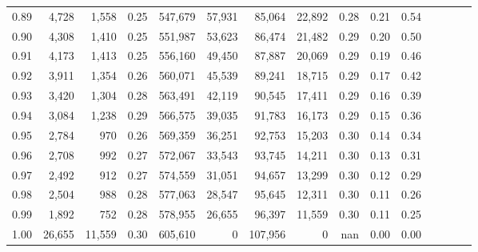 \begin{tabular}{rrrcrrrrrrrrrrr}
0.89 &   4,728 &   1,558 &                                       0.25 &  547,679 &   57,931 &   85,064 &   22,892 &  0.28 &  0.21 &                         0.54 \\
0.90 &   4,308 &   1,410 &                                       0.25 &  551,987 &   53,623 &   86,474 &   21,482 &  0.29 &  0.20 &                         0.50 \\
0.91 &   4,173 &   1,413 &                                       0.25 &  556,160 &   49,450 &   87,887 &   20,069 &  0.29 &  0.19 &                         0.46 \\
0.92 &   3,911 &   1,354 &                                       0.26 &  560,071 &   45,539 &   89,241 &   18,715 &  0.29 &  0.17 &                         0.42 \\
0.93 &   3,420 &   1,304 &                                       0.28 &  563,491 &   42,119 &   90,545 &   17,411 &  0.29 &  0.16 &                         0.39 \\
0.94 &   3,084 &   1,238 &                                       0.29 &  566,575 &   39,035 &   91,783 &   16,173 &  0.29 &  0.15 &                         0.36 \\
0.95 &   2,784 &     970 &                                       0.26 &  569,359 &   36,251 &   92,753 &   15,203 &  0.30 &  0.14 &                         0.34 \\
0.96 &   2,708 &     992 &                                       0.27 &  572,067 &   33,543 &   93,745 &   14,211 &  0.30 &  0.13 &                         0.31 \\
0.97 &   2,492 &     912 &                                       0.27 &  574,559 &   31,051 &   94,657 &   13,299 &  0.30 &  0.12 &                         0.29 \\
0.98 &   2,504 &     988 &                                       0.28 &  577,063 &   28,547 &   95,645 &   12,311 &  0.30 &  0.11 &                         0.26 \\
0.99 &   1,892 &     752 &                                       0.28 &  578,955 &   26,655 &   96,397 &   11,559 &  0.30 &  0.11 &                         0.25 \\
1.00 &  26,655 &  11,559 &                                       0.30 &  605,610 &        0 &  107,956 &        0 &   nan &  0.00 &                         0.00 \\
\bottomrule
\end{tabular}

